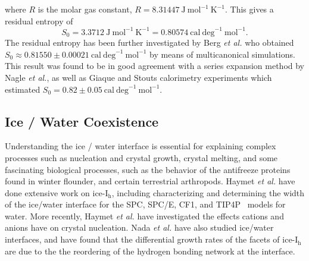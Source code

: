 where $R$ is the molar gas constant,
$R = 8.31447~\mathrm{J~mol}^{-1}~\mathrm{K}^{-1}$. This gives a
residual entropy of
\begin{equation}
  S_{0} = 3.3712~\mathrm{J~mol}^{-1}~\mathrm{K}^{-1} = 0.80574~\mathrm{cal~deg}^{-1}~ \mathrm{mol}^{-1}.
\end{equation}
The residual entropy has been further investigated by Berg \textit{et
  al.} who obtained
$S_{0} \approx 0.81550 \pm 0.00021~\mathrm{cal~deg}^{-1}
~\mathrm{mol}^{-1}$ by means of multicanonical
simulations.\cite{Berg2007} This result was found to be in good
agreement with a series expansion method by Nagle \textit{et
  al.}\cite{Nagle1966}, as well as Giaque and Stouts calorimetry
experiments which estimated
$S_{0} = 0.82 \pm 0.05~\mathrm{cal~deg}^{-1}
~\mathrm{mol}^{-1}$.\cite{Giaque1936}


\subsection{Ice / Water Coexistence}
%

Understanding the ice / water interface is essential for explaining
complex processes such as nucleation and crystal
growth,\cite{Han1992,Granasy1995,Vanfleet1995} crystal
melting,\cite{Weber1983,Han1992,Sakai1996,Sakai1996B} and some
fascinating biological processes, such as the behavior of the
antifreeze proteins found in winter flounder,\cite{Chapsky1997
  ,Wierzbicki2007} and certain terrestrial
arthropods.\cite{Duman:2001qy,Meister29012013} Haymet \textit{et al.}
have done extensive work on ice-I$_\mathrm{h}$, including
characterizing and determining the width of the ice/water interface
for the SPC,\cite{Karim1990} SPC/E,\cite{Gay2002,Bryk2002}
CF1,\cite{Hayward2001,Hayward2002} and TIP4P~\cite{Karim1988} models
for water.  More recently, Haymet \emph{et al.} have investigated the
effects cations and anions have on crystal
nucleation.\cite{Bryk2004,Smith2005,Wilson2008,Wilson2010} Nada
\textit{et al.}  have also studied ice/water
interfaces,\cite{Nada1995,Nada2000,Nada2003,Nada2012} and have found
that the differential growth rates of the facets of ice-I$_\mathrm{h}$
are due to the the reordering of the hydrogen bonding network at the
interface.\cite{Nada2005}


